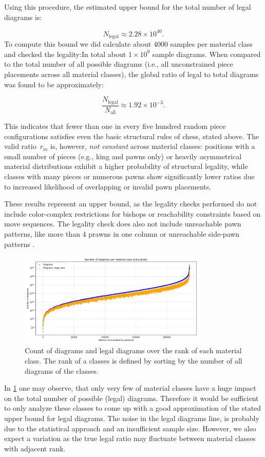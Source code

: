 \documentclass[12pt]{article}
\begin{document}
Using this procedure, the estimated upper bound for the total number of legal diagrams is:

\[
N_{\text{legal}} \approx 2.28 \times 10^{40}.
\]
To compute this bound we did calculate about 4000 samples per material class and checked the legality:In total about $1\times 10^{9}$ sample diagrams.
\noindent
When compared to the total number of all possible diagrams (i.e., all unconstrained piece placements across all material classes), the global ratio of legal to total diagrams was found to be approximately:

\[
\frac{N_{\text{legal}}}{N_{\text{all}}} \approx 1.92 \times 10^{-3}.
\]

This indicates that fewer than one in every five hundred random piece configurations satisfies even the basic structural rules of chess, stated above.
The valid ratio~$r_m$ is, however, \emph{not constant} across material classes: positions with a small number of pieces (e.g., king and pawns only) or heavily asymmetrical material distributions exhibit a higher probability of structural legality, while classes with many pieces or numerous pawns show significantly lower ratios due to increased likelihood of overlapping or invalid pawn placements.

These results represent an upper bound, as the legality checks performed do not include color-complex restrictions for bishops or reachability constraints based on move sequences. The legality check does also not include unreachable pawn patterns, like more than 4 prawns in one column or unreachable side-pawn patterns \cite{mcdonagh2022}.

\begin{figure}[h!]
  \centering
  \includegraphics[width=0.8\textwidth]{positions_per_class.png}
  \caption{Count of diagrams and legal diagrams over the rank of each material class. The rank of a classes is defined by sorting by the number of all diagrams of the classes.}
  \label{fig:diagrams_per_class}
\end{figure}
In \ref{fig:diagrams_per_class} one may observe, that only very few of material classes have a huge impact on the total number of possible (legal) diagrams. Therefore it would be sufficient to only analyze these classes to come up with a good approximation of the stated upper bound for legal diagrams. The noise in the legal diagrams line, is probably due to the statistical approach and an insufficient sample size. However, we also expect a variation as the true legal ratio may fluctuate between material classes with adjacent rank.
\end{document}
